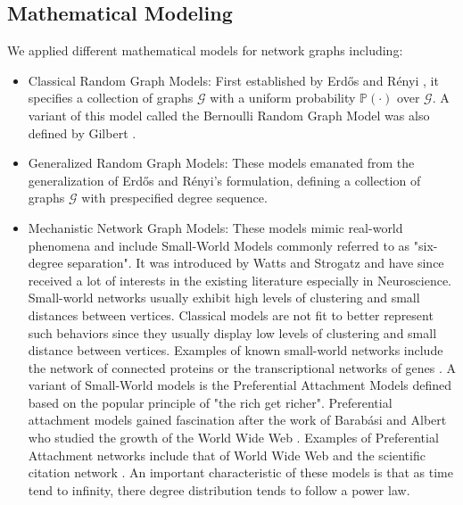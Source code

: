 \subsection{Mathematical Modeling}
We applied different mathematical models for network graphs including:
\begin{itemize}
\item Classical Random Graph Models: First established by Erd\H os and R\'enyi \cite{erdos_random_1959,erdos_evolution_1960,erdos_strength_1964}, it specifies a collection of graphs $\mathscr{G}$ with a uniform probability $\mathbb{P}(\cdot)$ over $\mathscr{G}$. A variant of this model called the Bernoulli Random Graph Model was also defined by Gilbert \cite{gilbert_random_1959}.
\item Generalized Random Graph Models: These models emanated from the generalization of Erd\H os and R\'enyi's formulation, defining a collection of graphs $\mathscr{G}$ with prespecified degree sequence.
\item Mechanistic Network Graph Models: These models mimic real-world phenomena and include Small-World Models commonly referred to as "six-degree separation". It was introduced by Watts and Strogatz \cite{watts_collective_1998} and have since received a lot of interests in the existing literature especially in Neuroscience. Small-world networks usually exhibit high levels of clustering and small distances between vertices. Classical models are not fit to better represent such behaviors since they usually display low levels of clustering and small distance between vertices. Examples of known small-world networks include the network of connected proteins  or the transcriptional networks of genes \cite{van_noort_yeast_2004}. A variant of Small-World models is the Preferential Attachment Models defined based on the popular principle of "the rich get richer". Preferential attachment models gained fascination after the work of Barab\'asi and Albert who studied the growth of the World Wide Web \cite{barabasi_emergence_1999}. Examples of Preferential Attachment networks include that of World Wide Web and the scientific citation network \cite{albert_internet:_1999,jeong_measuring_2003}. An important characteristic of these models is that as time tend to infinity, there degree distribution tends to follow a power law.
\end{itemize}

